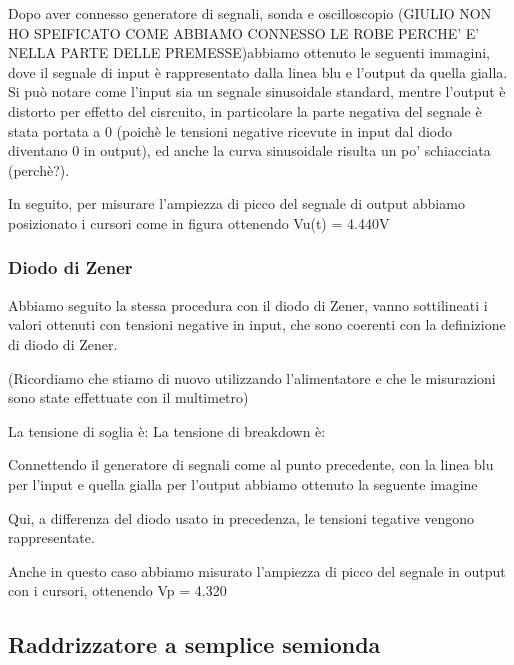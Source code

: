 \documentclass[a4paper]{article}
\begin{document}
{{			%
			
			Dopo aver connesso generatore di segnali, sonda e oscilloscopio (GIULIO NON HO SPEIFICATO COME ABBIAMO CONNESSO LE ROBE PERCHE' E' NELLA PARTE DELLE PREMESSE)abbiamo ottenuto le seguenti immagini, dove il segnale di input è rappresentato dalla linea blu e l'output da quella gialla. 
			Si può notare come l'input sia un segnale sinusoidale standard, mentre l'output è distorto per effetto del cisrcuito, in particolare la parte negativa del segnale è stata portata a 0 (poichè le tensioni negative ricevute in input dal diodo diventano 0 in output), ed anche la curva sinusoidale risulta un po' schiacciata (perchè?).
			
			In seguito, per misurare l'ampiezza di picco del segnale di output abbiamo posizionato i cursori come in figura ottenendo Vu(t) = 4.440V %
			
			\subsubsection{Diodo di Zener}
			Abbiamo seguito la stessa procedura con il diodo di Zener, vanno sottilineati i valori ottenuti con tensioni negative in input, che sono coerenti con la definizione di diodo di Zener.

			(Ricordiamo che stiamo di nuovo utilizzando l'alimentatore e che le misurazioni sono state effettuate con il multimetro)

		La tensione di soglia è: 
		La tensione di breakdown è:
		
		Connettendo il generatore di segnali come al punto precedente, con la linea blu per l'input e quella gialla per l'output abbiamo ottenuto la seguente imagine
		
		Qui, a differenza del diodo usato in precedenza, le tensioni tegative vengono rappresentate.		
		
		Anche in questo caso abbiamo misurato l'ampiezza di picco del segnale in output con i cursori, ottenendo Vp = 4.320 %
		
		\subsection{Raddrizzatore a semplice semionda}
}}
\end{document}
